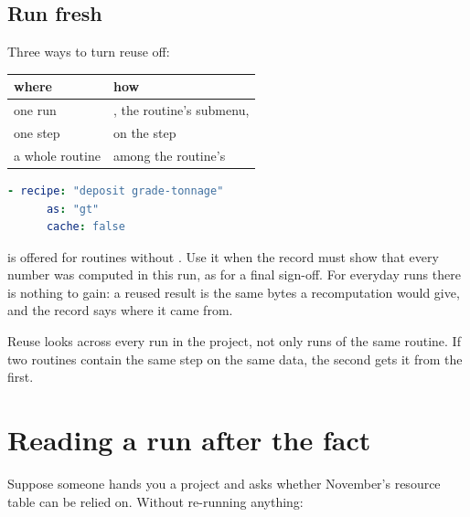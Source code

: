 \subsection{Run fresh}\label{sec:records-fresh}
Three ways to turn reuse off:

\begin{tabularx}{\linewidth}{@{}lL@{}}\toprule
where & how \\ \midrule
one run & , the routine's submenu,  \\
one step &  on the step \\
a whole routine &  among the routine's  \\
\bottomrule
\end{tabularx}

\begin{lstlisting}[language=yaml]
    - recipe: "deposit grade-tonnage"
      as: "gt"
      cache: false
\end{lstlisting}

 is offered for routines without . Use it when the record must show that every number was computed in this run, as for a final sign-off. For everyday runs there is nothing to gain: a reused result is the same bytes a recomputation would give, and the record says where it came from.

\begin{note}
Reuse looks across every run in the project, not only runs of the same routine. If two routines contain the same step on the same data, the second gets it from the first.
\end{note}

\section{Reading a run after the fact}\label{sec:records-reading}
Suppose someone hands you a project and asks whether November's resource table can be relied on. Without re-running anything:

